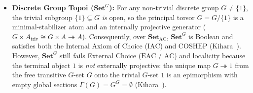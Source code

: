\documentclass[10pt,twoside,openright]{book}
\theoremstyle{crmplain}
\theoremstyle{crmdef}
\theoremstyle{crmremark}
\begin{document}
\begin{itemize}[leftmargin=1.5em]

  \item \textbf{Discrete Group Topoi ($\mathbf{Set}^G$):} For any non-trivial discrete group $G \neq \{1\}$, the trivial subgroup $\{1\} \subsetneq G$ \emph{is} open, so the principal torsor $G = G/\{1\}$ is a minimal-stabilizer atom and an internally projective generator ($G \times A_{\mathrm{triv}} \cong G \times A \twoheadrightarrow A$). Consequently, over $\mathbf{Set}_{\mathrm{AC}}$, $\mathbf{Set}^G$ is Boolean and satisfies both the Internal Axiom of Choice ($\mathrm{IAC}$) and $\mathrm{COSHEP}$ (Kihara~\cite[Theorem~6.2]{Kihara26}). However, $\mathbf{Set}^G$ still fails External Choice ($\mathrm{EAC}$ / $\mathrm{AC}$) and localicity because the terminal object $1$ is \emph{not} externally projective: the unique map $G \twoheadrightarrow 1$ from the free transitive $G$-set $G$ onto the trivial $G$-set $1$ is an epimorphism with empty global sections $\Gamma(G) = G^G = \emptyset$ (Kihara~\cite[Theorem~6.19]{Kihara26}).


\end{itemize}
\end{document}
